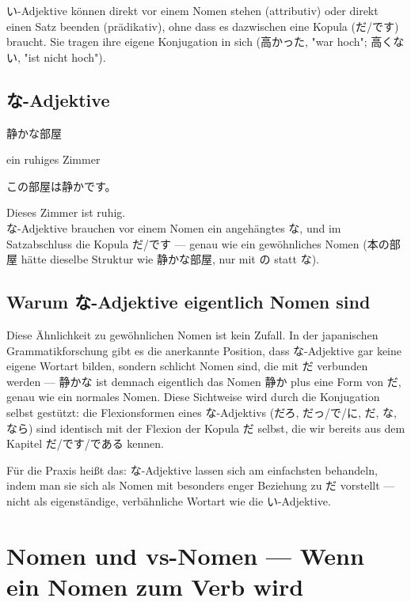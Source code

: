 \documentclass[12pt]{book}
\begin{document}
い-Adjektive können direkt vor einem Nomen stehen (attributiv) oder direkt einen Satz beenden (prädikativ), ohne dass es dazwischen eine Kopula (だ/です) braucht. Sie tragen ihre eigene Konjugation in sich (高かった, "war hoch"; 高くない, "ist nicht hoch").

\section*{な-Adjektive}

\par\quad 静かな部屋\\
\par\quad ein ruhiges Zimmer\\

\par\quad この部屋は静かです。\\
\par\quad Dieses Zimmer ist ruhig.\\

な-Adjektive brauchen vor einem Nomen ein angehängtes な, und im Satzabschluss die Kopula だ/です — genau wie ein gewöhnliches Nomen (本の部屋 hätte dieselbe Struktur wie 静かな部屋, nur mit の statt な).

\section*{Warum な-Adjektive eigentlich Nomen sind}

Diese Ähnlichkeit zu gewöhnlichen Nomen ist kein Zufall. In der japanischen Grammatikforschung gibt es die anerkannte Position, dass な-Adjektive gar keine eigene Wortart bilden, sondern schlicht Nomen sind, die mit だ verbunden werden — 静かな ist demnach eigentlich das Nomen 静か plus eine Form von だ, genau wie ein normales Nomen. Diese Sichtweise wird durch die Konjugation selbst gestützt: die Flexionsformen eines な-Adjektivs (だろ, だっ/で/に, だ, な, なら) sind identisch mit der Flexion der Kopula だ selbst, die wir bereits aus dem Kapitel だ/です/である kennen.

Für die Praxis heißt das: な-Adjektive lassen sich am einfachsten behandeln, indem man sie sich als Nomen mit besonders enger Beziehung zu だ vorstellt — nicht als eigenständige, verbähnliche Wortart wie die い-Adjektive.


\chapter{Nomen und vs-Nomen — Wenn ein Nomen zum Verb wird}
\end{document}
